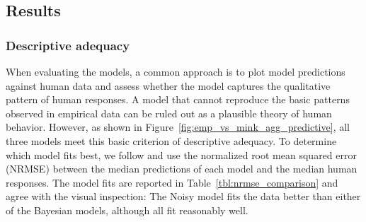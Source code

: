 \subsection{Results}


\subsubsection{Descriptive adequacy}

When evaluating the models, a common approach is to plot model predictions against human data and assess whether the model captures the qualitative pattern of human responses. A model that cannot reproduce the basic patterns observed in empirical data can be ruled out as a plausible theory of human behavior. However, as shown in Figure~\ref{fig:emp_vs_mink_agg_predictive}, all three models meet this basic criterion of descriptive adequacy. To determine which model fits best, we follow  and use the normalized root mean squared error (NRMSE) between the median predictions of each model and the median human responses. The model fits are reported in Table~\ref{tbl:nrmse_comparison} and agree with the visual inspection: The Noisy \mink model fits the data better than either of the Bayesian models, although all fit reasonably well. 


